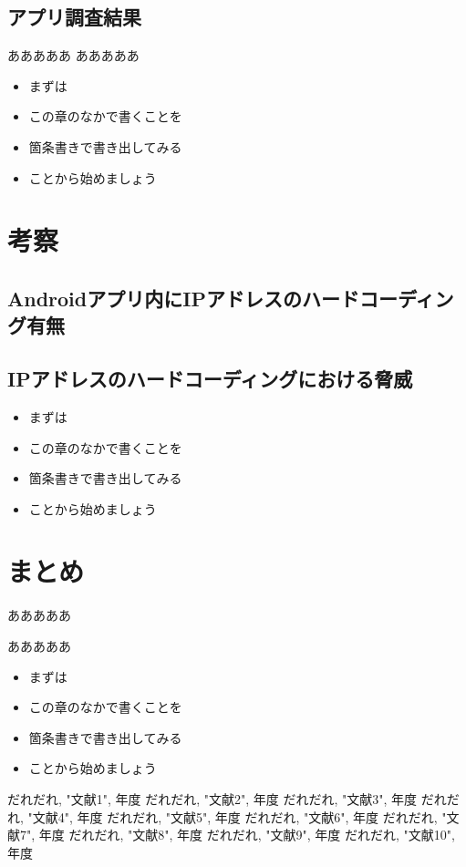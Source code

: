 \documentclass[a4j]{jarticle}
\begin{document}
\subsection{アプリ調査結果}
あああああ
あああああ

\begin{itemize}
\item まずは
\item この章のなかで書くことを
\item 箇条書きで書き出してみる
\item ことから始めましょう
\end{itemize}

\newpage
\section{考察}
\subsection{Androidアプリ内にIPアドレスのハードコーディング有無}
\subsection{IPアドレスのハードコーディングにおける脅威}
\begin{itemize}
\item まずは
\item この章のなかで書くことを
\item 箇条書きで書き出してみる
\item ことから始めましょう
\end{itemize}

\newpage
\section{まとめ}
あああああ

あああああ

\begin{itemize}
\item まずは
\item この章のなかで書くことを
\item 箇条書きで書き出してみる
\item ことから始めましょう
\end{itemize}



\newpage
\begin{thebibliography}{99}
だれだれ, "文献1", 年度
だれだれ, "文献2", 年度
だれだれ, "文献3", 年度
だれだれ, "文献4", 年度
だれだれ, "文献5", 年度
だれだれ, "文献6", 年度
だれだれ, "文献7", 年度
だれだれ, "文献8", 年度
だれだれ, "文献9", 年度
だれだれ, "文献10", 年度

\end{thebibliography}
\end{document}

